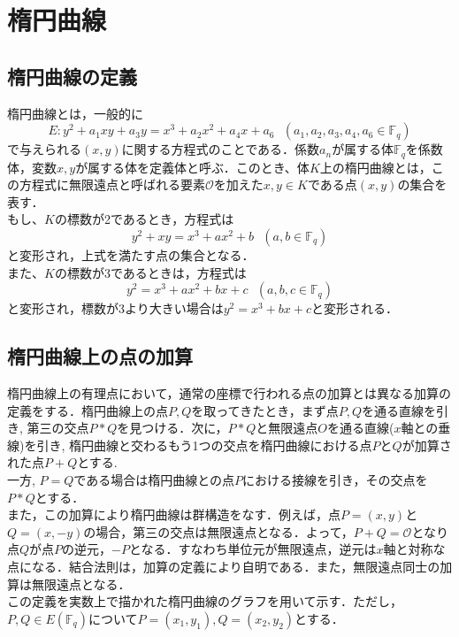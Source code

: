\chapter{楕円曲線}
\section{楕円曲線の定義}
\par
楕円曲線とは，一般的に
\[
E:y^2+a_1xy+a_3y=x^3+a_2x^2+a_4x+a_6 \ \ \ (a_1,a_2,a_3,a_4,a_6\in \mathbb {F}_q)
\]
で与えられる$(x,y)$に関する方程式のことである．係数$a_n$が属する体$\mathbb {F}_q$を係数体，変数$x,y$が属する体を定義体と呼ぶ．このとき、体$K$上の楕円曲線とは，この方程式に無限遠点と呼ばれる要素$\mathcal{O}$を加えた$x,y\in K$である点$(x,y)$の集合を表す．\\
もし、$K$の標数が2であるとき，方程式は
\[
y^2+xy=x^3+ax^2+b \ \ \ (a,b\in \mathbb {F}_q)
\]
と変形され，上式を満たす点の集合となる．\\
また、$K$の標数が3であるときは，方程式は
\[
y^2=x^3+ax^2+bx+c \ \ \ (a,b,c\in \mathbb {F}_q)
\]
と変形され，標数が3より大きい場合は$y^2=x^3+bx+c$と変形される．\\
\par
\section{楕円曲線上の点の加算}
\par
楕円曲線上の有理点において，通常の座標で行われる点の加算とは異なる加算の定義をする．楕円曲線上の点$P,Q$を取ってきたとき，まず点$P,Q$を通る直線を引き, 第三の交点$P\ast Q$を見つける．次に，$P\ast Q$と無限遠点$O$を通る直線($x$軸との垂線)を引き, 楕円曲線と交わるもう1つの交点を楕円曲線における点$P$と$Q$が加算された点$P+Q$とする. \\
一方, $P=Q$である場合は楕円曲線との点$P$における接線を引き，その交点を$P\ast Q$とする．\\
また，この加算により楕円曲線は群構造をなす．例えば，点$P=(x,y)$と$Q=(x,-y)$の場合，第三の交点は無限遠点となる．よって，$P+Q=\mathcal{O}$となり点$Q$が点$P$の逆元，$−P$となる．すなわち単位元が無限遠点，逆元は$x$軸と対称な点になる．結合法則は，加算の定義により自明である．また，無限遠点同士の加算は無限遠点となる．\\
この定義を実数上で描かれた楕円曲線のグラフを用いて示す．ただし，$P,Q\in E(\mathbb{F}_q)$について$P=(x_1,y_1),Q=(x_2,y_2)$とする．

